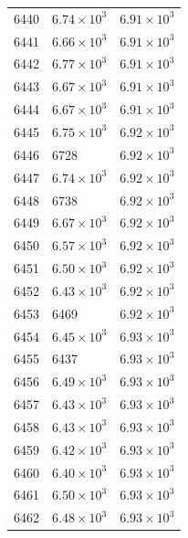 \begin{table}[H]
\begin{tabular}{lll}
6440 & $\displaystyle 6.74 \times 10^{3}$ & $\displaystyle 6.91 \times 10^{3}$ \\
6441 & $\displaystyle 6.66 \times 10^{3}$ & $\displaystyle 6.91 \times 10^{3}$ \\
6442 & $\displaystyle 6.77 \times 10^{3}$ & $\displaystyle 6.91 \times 10^{3}$ \\
6443 & $\displaystyle 6.67 \times 10^{3}$ & $\displaystyle 6.91 \times 10^{3}$ \\
6444 & $\displaystyle 6.67 \times 10^{3}$ & $\displaystyle 6.91 \times 10^{3}$ \\
6445 & $\displaystyle 6.75 \times 10^{3}$ & $\displaystyle 6.92 \times 10^{3}$ \\
6446 & 6728 & $\displaystyle 6.92 \times 10^{3}$ \\
6447 & $\displaystyle 6.74 \times 10^{3}$ & $\displaystyle 6.92 \times 10^{3}$ \\
6448 & 6738 & $\displaystyle 6.92 \times 10^{3}$ \\
6449 & $\displaystyle 6.67 \times 10^{3}$ & $\displaystyle 6.92 \times 10^{3}$ \\
6450 & $\displaystyle 6.57 \times 10^{3}$ & $\displaystyle 6.92 \times 10^{3}$ \\
6451 & $\displaystyle 6.50 \times 10^{3}$ & $\displaystyle 6.92 \times 10^{3}$ \\
6452 & $\displaystyle 6.43 \times 10^{3}$ & $\displaystyle 6.92 \times 10^{3}$ \\
6453 & 6469 & $\displaystyle 6.92 \times 10^{3}$ \\
6454 & $\displaystyle 6.45 \times 10^{3}$ & $\displaystyle 6.93 \times 10^{3}$ \\
6455 & 6437 & $\displaystyle 6.93 \times 10^{3}$ \\
6456 & $\displaystyle 6.49 \times 10^{3}$ & $\displaystyle 6.93 \times 10^{3}$ \\
6457 & $\displaystyle 6.43 \times 10^{3}$ & $\displaystyle 6.93 \times 10^{3}$ \\
6458 & $\displaystyle 6.43 \times 10^{3}$ & $\displaystyle 6.93 \times 10^{3}$ \\
6459 & $\displaystyle 6.42 \times 10^{3}$ & $\displaystyle 6.93 \times 10^{3}$ \\
6460 & $\displaystyle 6.40 \times 10^{3}$ & $\displaystyle 6.93 \times 10^{3}$ \\
6461 & $\displaystyle 6.50 \times 10^{3}$ & $\displaystyle 6.93 \times 10^{3}$ \\
6462 & $\displaystyle 6.48 \times 10^{3}$ & $\displaystyle 6.93 \times 10^{3}$ \\

\end{tabular}
\end{table}
